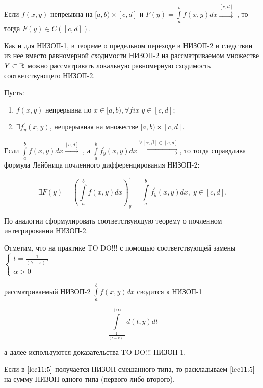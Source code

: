\documentclass[../../main.tex]{subfiles}
\begin{document}
	\begin{crl*}
		Если $f(x, y)$ непреывна на $[a, b) \times [c, d]$ и $F(y) = \int\limits_a^b f(x, y) dx \overset{[c, d]}\rightrightarrows \;$, то тогда $F(y) \in C([c, d])$.
	\end{crl*}

	\begin{rem}
		Как и для НИЗОП-1, в теореме о предельном переходе в НИЗОП-2 и следствии из нее вместо равномерной сходимости НИЗОП-2 на рассматриваемом множестве $Y \subset \mathbb{R}$ можно рассматривать локальную равномерную сходимость соответствующего НИЗОП-2.
	\end{rem}

	\begin{thm}
		Пусть:

		\begin{enumerate}
			\item $f(x, y)$ непрерывна по $x \in [a, b), \forall fix \; y \in [c, d]$;
			\item $\exists f^{'}_{y} (x, y)$, непрерывная на множестве $[a, b) \times [c, d]$.
		\end{enumerate}

		Если $\int\limits_a^b f(x, y) dx \overset{[c, d]}\rightarrow\;$, а $\int\limits_a^b f^{'}_y (x, y) dx \overset{\forall [\alpha, \beta] \subset [c, d]}{\rightrightarrows}$, то тогда справдлива формула Лейбница почленного дифференцирования НИЗОП-2:
		
		$$
		\exists F(y) = \left( \int\limits_a^b f(x, y) dx \right)^{'}_y = \int\limits_a^b f^{'}_y (x, y) dx, \; y \in [c, d].
		$$
	\end{thm}

	\begin{exc}
		По аналогии сформулировать соответствующую теорему о почленном интегрировании НИЗОП-2.
	\end{exc}

	Отметим, что на практике TO DO!!! с помощью соответствующей замены 
	$\displaystyle 
	\left\{
		\begin{gathered}
			t = \frac{1}{(b - x)^\alpha} \\
			\alpha > 0
		\end{gathered}
	\right.
	$ 
	
	рассматриваемый НИЗОП-2 $\int\limits_a^b f(x, y) dx$ сводится к НИЗОП-1 
	
	\begin{equation}\label{lec11:5}
		\int\limits_{\frac{1}{(b - x)^\alpha}}^{+\infty} d(t, y) dt
	\end{equation}

	а далее используются доказательства TO DO!!! НИЗОП-1.
	
	Если в $\eqref{lec11:5}$ получается НИЗОП смешанного типа, то раскладываем $\eqref{lec11:5}$ на сумму НИЗОП одного типа (первого либо второго).
	
\end{document}
